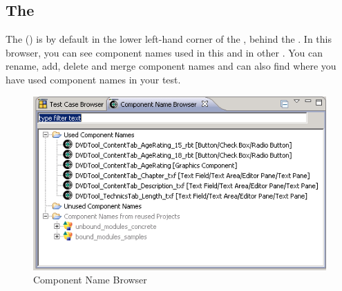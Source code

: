 
\subsection{The \gdcompnamebrowser}

The \gdcompnamebrowser{} () is by default in the lower left-hand corner of the \specpersp{}, behind the \gdtestcasebrowser{}. In this browser, you can see component names used in this \gdproject{} and in other \gdprojects{}. You can rename, add, delete and merge component names and can also find where you have used component names in your test. 
 

\begin{figure}[h]
\begin{center}
\includegraphics{Userinterface/Editors/PS/compnamesbrowser}
\caption{Component Name Browser}
\label{compnamesbrowser}
\end{center}
\end{figure}
